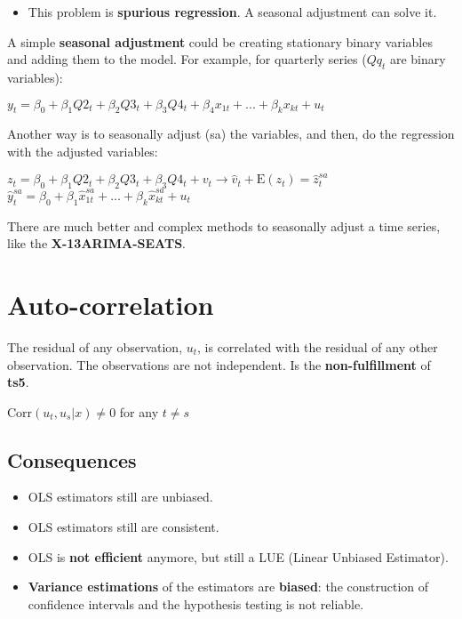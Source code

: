 \documentclass[10pt, a4paper, landscape]{extarticle}
\newcommand{\E}{\mathrm{E}}
\newcommand{\Corr}{\mathrm{Corr}}
\begin{document}
\begin{multicols}{3}
\begin{multicols}{2}
		\end{multicols}
		\begin{itemize}[leftmargin=*]
			\item This problem is \textbf{spurious regression}. A seasonal adjustment can solve it.
		\end{itemize}
		A simple \textbf{seasonal adjustment} could be creating stationary binary variables and adding them to the model. For example, for quarterly series ($Qq_t$ are binary variables):
		\begin{center}
			$y_t = \beta_0 + \beta_1 Q2_t + \beta_2 Q3_t + \beta_3 Q4_t + \beta_4 x_{1t} + ... + \beta_k x_{kt} + u_t$
		\end{center}
		Another way is to seasonally adjust (sa) the variables, and then, do the regression with the adjusted variables:
		\begin{center}
			$z_t = \beta_0 + \beta_1 Q2_t + \beta_2 Q3_t + \beta_3 Q4_t  + v_t \rightarrow \hat{v}_t + \E(z_t) = \hat{z}_t^{sa}$
			$\hat{y}_t^{sa} = \beta_0 + \beta_1 \hat{x}_{1t}^{sa} + ... + \beta_k \hat{x}_{kt}^{sa} + u_t$
		\end{center}
		There are much better and complex methods to seasonally adjust a time series, like the \textbf{X-13ARIMA-SEATS}.
\columnbreak
\section*{Auto-correlation}
	The residual of any observation, $u_t$, is correlated with the residual of any other observation. The observations are not independent. Is the \textbf{non-fulfillment} of \textbf{ts5}.
	\begin{center}
		$\Corr(u_t, u_s | x) \neq 0$ for any $t \neq s$
	\end{center}
	\subsection*{Consequences}
		\begin{itemize}[leftmargin=*]
			\item OLS estimators still are unbiased.
			\item OLS estimators still are consistent.
			\item OLS is \textbf{not efficient} anymore, but still a LUE (Linear Unbiased Estimator).
			\item \textbf{Variance estimations} of the estimators are \textbf{biased}: the construction of confidence intervals and the hypothesis testing is not reliable.
		\end{itemize}

\end{multicols}
\end{document}
